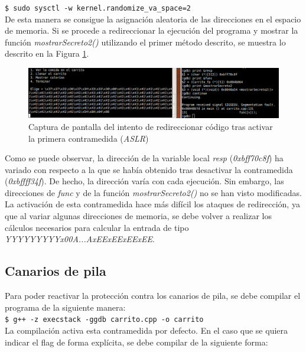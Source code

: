\documentclass[10pt,a4paper]{article}
\begin{document}
\texttt{\$ sudo sysctl -w kernel.randomize\_va\_space=2}\\

De esta manera se consigue la asignación aleatoria de las direcciones en el espacio de memoria.
Si se procede a redireccionar la ejecución del programa y mostrar la función \textit{mostrarSecreto2()} utilizando el primer método descrito, se muestra lo descrito en la Figura \ref{fig:contramedida1}.

\begin{figure}[h!]
	\centering
	\includegraphics[scale=0.6]{images/contramedida_1.png}
	\caption{Captura de pantalla del intento de redireccionar código tras activar la primera contramedida (\textit{ASLR})}
	\label{fig:contramedida1}
\end{figure}

Como se puede observar, la dirección de la variable local \textit{resp} (\textit{0xbff70c8f}) ha variado con respecto a la que se había obtenido tras desactivar la contramedida (\textit{0xbffff34f}). De hecho, la dirección varía con cada ejecución. Sin embargo, las direcciones de \textit{func} y de la función \textit{mostrarSecreto2()} no se han visto modificadas.\\
La activación de esta contramedida hace más difícil los ataques de redirección, ya que al variar algunas direcciones de memoria, se debe volver a realizar los cálculos necesarios para calcular la entrada de tipo \textit{YYYYYYYYYx00A...AxEExEExEExEE}.\\


\subsection{Canarios de pila}

Para poder reactivar la protección contra los canarios de pila, se debe compilar el programa de la siguiente manera: \\

\texttt{\$ g++ -z execstack -ggdb carrito.cpp -o carrito}\\

La compilación activa esta contramedida por defecto. En el caso que se quiera indicar el flag de forma explícita, se debe compilar de la siguiente forma:\\
\end{document}

